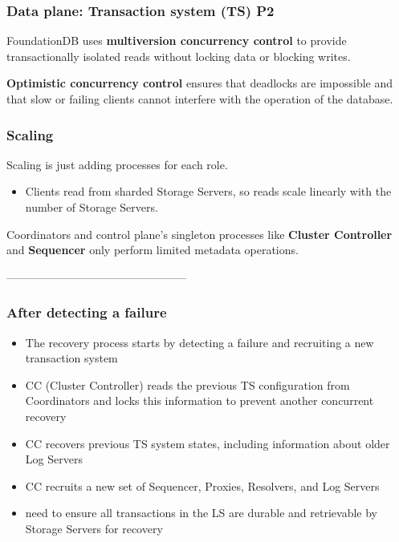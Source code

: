 
\begin{frame}
	\frametitle{Data plane: Transaction system (TS) P2}

FoundationDB uses \textbf{multiversion concurrency control} to provide transactionally isolated reads without locking data or blocking writes.
\vspace{0.5cm}

\textbf{Optimistic concurrency control} ensures that deadlocks are impossible and that slow or failing clients cannot interfere with the operation of the database.
	
\end{frame}


\begin{frame}
	\frametitle{Scaling}
Scaling is just adding processes for each role. \\

\begin{itemize}
\item Clients read from sharded Storage Servers, so reads scale
linearly with the number of Storage Servers. 
\end{itemize}

\vspace{0.5cm}
Coordinators and control plane's singleton processes like \textbf{Cluster Controller} and \textbf{Sequencer} only perform limited metadata operations.
	
\end{frame}

------------------------------------------------
\begin{frame}
	\frametitle{After detecting a failure}
    \begin{itemize}
        \item The recovery process starts by
        detecting a failure and recruiting a new transaction system
        \item CC (Cluster Controller) reads the previous TS configuration from Coordinators and locks this information
        to prevent another concurrent recovery
        \item CC recovers previous TS system states, including information about older Log Servers
        \item CC recruits a new set of Sequencer, Proxies, Resolvers,
        and Log Servers
        \item need to ensure all transactions in the LS are durable and retrievable by Storage Servers for recovery

    \end{itemize}

\end{frame}

